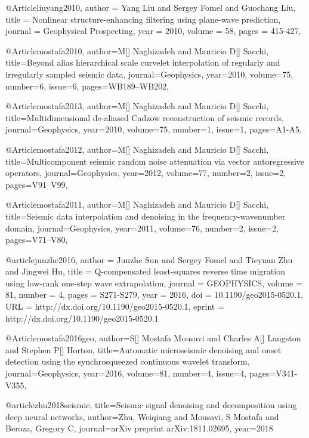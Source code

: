 @Article{liuyang2010,
  author = 	 {Yang Liu and Sergey Fomel and Guochang Liu},
  title = 	 {Nonlinear structure-enhancing filtering using plane-wave prediction},
  journal = 	 {Geophysical Prospecting},
  year = 	 2010,
  volume =	 58,
  pages =	 {415-427},
}

@Article{mostafa2010,
  author={M[] Naghizadeh and Mauricio D[] Sacchi},
  title={Beyond alias hierarchical scale curvelet interpolation of regularly and irregularly sampled seismic data},
  journal={Geophysics},
  year=2010,
  volume=75,
  number=6,
  issue=6,
  pages={WB189–WB202},
}

@Article{mostafa2013,
  author={M[] Naghizadeh and Mauricio D[] Sacchi},
  title={Multidimensional de-aliased {C}adzow reconstruction of seismic records},
  journal={Geophysics},
  year=2010,
  volume=75,
  number=1,
  issue=1,
  pages={A1-A5},
}

@Article{mostafa2012,
  author={M[] Naghizadeh and Mauricio D[] Sacchi},
  title={Multicomponent seismic random noise attenuation via vector autoregressive operators},
  journal={Geophysics},
  year=2012,
  volume=77,
  number=2,
  issue=2,
  pages={V91–V99},
}

@Article{mostafa2011,
  author={M[] Naghizadeh and Mauricio D[] Sacchi},
  title={Seismic data interpolation and denoising in the frequency-wavenumber domain},
  journal={Geophysics},
  year=2011,
  volume=76,
  number=2,
  issue=2,
  pages={V71–V80},
}




@article{junzhe2016,
author = {Junzhe Sun and Sergey Fomel and Tieyuan Zhu and Jingwei Hu},
title = {Q-compensated least-squares reverse time migration using low-rank one-step wave extrapolation},
journal = {GEOPHYSICS},
volume = {81},
number = {4},
pages = {S271-S279},
year = {2016},
doi = {10.1190/geo2015-0520.1},
URL = {http://dx.doi.org/10.1190/geo2015-0520.1},
eprint = {http://dx.doi.org/10.1190/geo2015-0520.1}
}

@Article{mostafa2016geo,
  author={S[] Mostafa Mousavi and Charles A[] Langston and Stephen P[] Horton},
  title={Automatic microseismic denoising and onset detection using the synchrosqueezed continuous wavelet transform},
  journal={Geophysics},
  year=2016,
  volume=81,
  number=4,
  issue=4,
  pages={V341-V355},
}



@article{zhu2018seismic,
  title={Seismic signal denoising and decomposition using deep neural networks},
  author={Zhu, Weiqiang and Mousavi, S Mostafa and Beroza, Gregory C},
  journal={arXiv preprint arXiv:1811.02695},
  year={2018}
}

